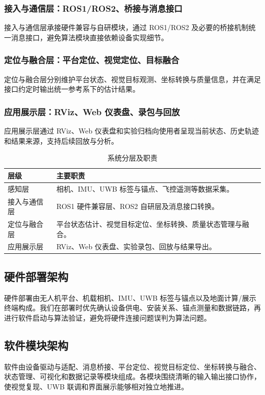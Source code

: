 \documentclass[UTF8,a4paper,12pt]{ctexart}
\begin{document}
\subsubsection{接入与通信层：ROS1/ROS2、桥接与消息接口}
接入与通信层承接硬件兼容与自研模块，通过 ROS1/ROS2 及必要的桥接机制统一消息接口，避免算法模块直接依赖设备实现细节。

\subsubsection{定位与融合层：平台定位、视觉定位、目标融合}
定位与融合层分别维护平台状态、视觉目标观测、坐标转换与质量信息，并在满足接口约定时输出统一参考系下的估计结果。

\subsubsection{应用展示层：RViz、Web 仪表盘、录包与回放}
应用展示层通过 RViz、Web 仪表盘和实验归档向使用者呈现当前状态、历史轨迹和结果来源，支持后续回放与分析。

\begin{table}[htbp]
  \centering
  \caption{系统分层及职责}
  \begin{tabular}{p{3.0cm}p{10.0cm}}
    \toprule
    层级 & 主要职责 \\
    \midrule
    感知层 & 相机、IMU、UWB 标签与锚点、飞控遥测等数据采集。\\
    接入与通信层 & ROS1 硬件兼容层、ROS2 自研层及消息接口转换。\\
    定位与融合层 & 平台状态估计、视觉目标定位、坐标转换、质量状态管理与融合。\\
    应用展示层 & RViz、Web 仪表盘、实验录包、回放与结果导出。\\
    \bottomrule
  \end{tabular}
\end{table}

\subsection{硬件部署架构}
硬件部署由无人机平台、机载相机、IMU、UWB 标签与锚点以及地面计算/展示终端构成。我们在部署时优先确认设备供电、安装关系、锚点测量和数据链路，再进行软件启动与算法验证，避免将硬件连接问题误判为算法问题。

\subsection{软件模块架构}
软件由设备驱动与适配、消息桥接、平台定位、视觉目标定位、坐标转换与融合、状态管理、可视化和数据记录等模块组成。各模块围绕清晰的输入输出接口协作，使视觉复现、UWB 联调和界面展示能够相对独立地推进。
\end{document}
